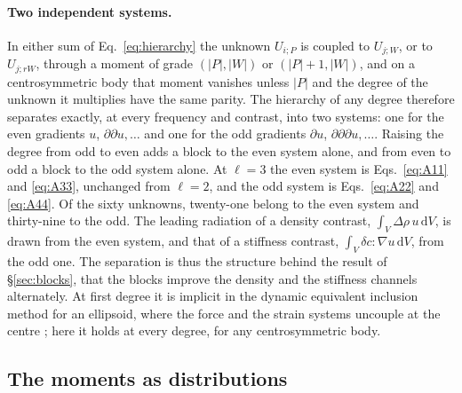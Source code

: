 \documentclass[11pt,a4paper]{article}
\newcommand{\dd}{\mathrm{d}}
\begin{document}
\paragraph{Two independent systems.} In either sum of Eq.~\eqref{eq:hierarchy} the unknown
$U_{i;P}$ is coupled to $U_{j;W}$, or to $U_{j;rW}$, through a moment of grade $(|P|,|W|)$ or
$(|P|+1,|W|)$, and on a centrosymmetric body that moment vanishes unless $|P|$ and the degree of the
unknown it multiplies have the same parity. The hierarchy of any degree therefore separates exactly,
at every frequency and contrast, into two systems: one for the even gradients $u$,
$\partial\partial u,\dots$ and one for the odd gradients $\partial u$, $\partial\partial\partial
u,\dots$. Raising the degree from odd to even adds a block to the even system alone, and from even to
odd a block to the odd system alone. At $\ell=3$ the even system is Eqs.~\eqref{eq:A11} and
\eqref{eq:A33}, unchanged from $\ell=2$, and the odd system is Eqs.~\eqref{eq:A22} and \eqref{eq:A44}.
Of the sixty unknowns, twenty-one belong to the even system and thirty-nine to the odd. The leading radiation of a density contrast,
$\int_V\Delta\rho\,u\,\dd V$, is drawn from the even system, and that of a stiffness contrast,
$\int_V\delta c:\nabla u\,\dd V$, from the odd one. The separation is thus the structure behind the
result of \S\ref{sec:blocks}, that the blocks improve the density and the stiffness channels
alternately. At first degree it is implicit in the dynamic equivalent inclusion method for an
ellipsoid, where the force and the strain systems uncouple at the centre \citep{FuMura1983}; here it
holds at every degree, for any centrosymmetric body.

\subsection{The moments as distributions}\label{sec:distributions}
\end{document}
